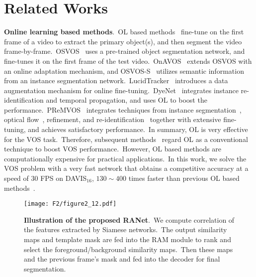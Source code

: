 \documentclass[10pt,twocolumn,letterpaper]{article}
\begin{document}
\section{Related Works}
\noindent
{\bf Online learning based methods}.\
OL based methods~\cite{osvos,onavos,masktrack,osvos-s,reid,lucid,premvos,premvos2,premvos3} fine-tune on the first frame of a video to extract the primary object(s), and then segment the video frame-by-frame.\ OSVOS~\cite{osvos} uses a pre-trained object segmentation network, and fine-tunes it on the first frame of the test video.\ OnAVOS~\cite{onavos} extends OSVOS with an online adaptation mechanism, and OSVOS-S~\cite{osvos-s} utilizes semantic information from an instance segmentation network.\ LucidTracker~\cite{lucid} introduces a data augmentation mechanism for online fine-tuning.\ DyeNet~\cite{reid} integrates instance re-identification and temporal propagation, and uses OL to boost the performance.\ PReMVOS~\cite{premvos,premvos2,premvos3} integrates techniques from instance segmentation~\cite{mask-rcnn}, optical flow~\cite{flownet,flownet2}, refinement, and re-identification~\cite{personsearch} together with extensive fine-tuning, and achieves satisfactory performance.\ In summary, OL is very effective for the VOS task.\ Therefore, subsequent methods~\cite{masktrack, cinm, reid} regard OL as a conventional technique to boost VOS performance.\ However, OL based methods are computationally expensive for practical applications.\ In this work, we solve the VOS problem with a very fast network that obtains a competitive accuracy at a speed of $30$ FPS on DAVIS$_{16}$, $130\sim400$ times faster than previous OL based methods~\cite{osvos, masktrack, osvos-s, onavos}.







\begin{figure*}[t]
\vspace{-5mm}
\begin{center}
\texttt{[image: F2/figure2\_12.pdf]}
\end{center}
\vspace{-7mm}
\caption{\textbf{Illustration of the proposed RANet}.\ We compute correlation of the features extracted by Siamese networks.\ The output similarity maps and template mask are fed into the RAM module to rank and select the foreground/background similarity maps.\ Then these maps and the previous frame's mask and fed into the decoder for final segmentation.}
\label{fig:our}
\vspace{-5mm}
\end{figure*}
\end{document}
